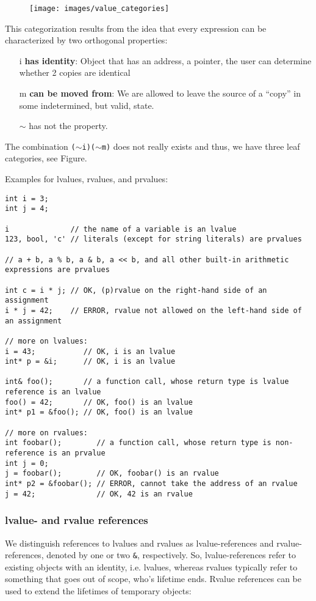 \begin{figure}[ht]
\begin{center}
\texttt{[image: images/value\_categories]}
\end{center}
\end{figure}

This categorization results from the idea that every expression can be characterized by two orthogonal properties:
\begin{enumerate}
\item[i] \textbf{has identity}: Object that has an address, a pointer, the user can determine whether 2 copies are identical
\item[m] \textbf{can be moved from}: We are allowed to leave the source of a ``copy'' in some indetermined, but valid, state.
\item[$\sim$] has not the property.
\end{enumerate}

The combination \texttt{($\sim$i)($\sim$m)} does not really exists and thus, we have three leaf categories, see Figure.

Examples for lvalues, rvalues, and prvalues:
\begin{verbatim}
int i = 3;
int j = 4;

i              // the name of a variable is an lvalue
123, bool, 'c' // literals (except for string literals) are prvalues

// a + b, a % b, a & b, a << b, and all other built-in arithmetic expressions are prvalues

int c = i * j; // OK, (p)rvalue on the right-hand side of an assignment
i * j = 42;    // ERROR, rvalue not allowed on the left-hand side of an assignment

// more on lvalues:
i = 43;           // OK, i is an lvalue
int* p = &i;      // OK, i is an lvalue

int& foo();       // a function call, whose return type is lvalue reference is an lvalue
foo() = 42;       // OK, foo() is an lvalue
int* p1 = &foo(); // OK, foo() is an lvalue

// more on rvalues:
int foobar();        // a function call, whose return type is non-reference is an prvalue
int j = 0;
j = foobar();        // OK, foobar() is an rvalue
int* p2 = &foobar(); // ERROR, cannot take the address of an rvalue
j = 42;              // OK, 42 is an rvalue
\end{verbatim}


\subsubsection{lvalue- and rvalue references}
We distinguish references to lvalues and rvalues as lvalue-references and rvalue-references, denoted by one or two \texttt{\&}, respectively. So,
lvalue-references refer to existing objects with an identity, i.e. lvalues, whereas rvalues typically refer to something that goes out of scope, who's
lifetime ends. Rvalue references can be used to extend the lifetimes of temporary objects:

